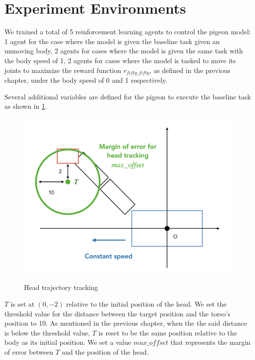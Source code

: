 \section{Experiment Environments}
  We trained a total of 5 reinforcement learning agents to control the pigeon model: 1 agent for the case where the model is given the baseline task given an unmoving body, 2 agents for cases where the model is given the same task with the body speed of 1, 2 agents for cases where the model is tasked to move its joints to maximize the reward function $r_{fifty\_fifty}$, as defined in the previous chapter, under the body speed of 0 and 1 respectively.

    Several additional variables are defined for the pigeon to execute the baseline task as shown in \ref{fig:pigeon_target}.
      \begin{figure}[H]
          \centering
          \includegraphics[width=1\textwidth]{figures/pigeon_diagram/pigeon_diagram_002.png}
          \label{fig:pigeon_target}
          \caption{Head trajectory tracking}
      \end{figure}
    $T$ is set at $(0, -2)$ relative to the initial position of the head.
    We set the threshold value for the distance between the target position and the torso's position to 10. As mentioned in the previous chapter, when the the said distance is below the threshold value, $T$ is reset to be the same position relative to the body as its initial position.
    We set a value $max\_offset$ that represents the margin of error between $T$ and the position of the head.

